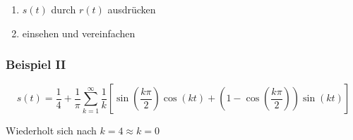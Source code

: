 \begin{enumerate}
	\item $s(t)$ durch $r(t)$ ausdrücken
	\item einsehen und vereinfachen
	\end{enumerate}


\subsubsection{Beispiel II}

\[
s(t) = \frac{1}{4} + \frac{1}{\pi} \sum^\infty_{k=1} \frac{1}{k} \left[ \sin\left(\frac{k \pi}{2}\right) \cos(k t) + \left(1 - \cos\left(\frac{k \pi}{2}\right)\right) \sin(kt) \right]
\]

Wiederholt sich nach $k=4 \approx k=0$

